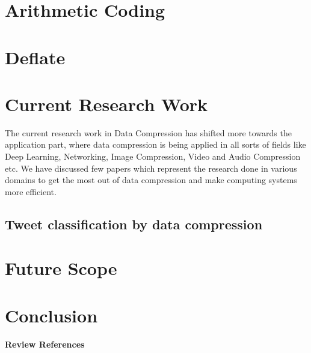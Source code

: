 \documentclass{article}
\begin{document}
\section{Arithmetic Coding}

\section{Deflate}

\section{Current Research Work}

The current research work in Data Compression has shifted more towards the application part, where data compression is being applied in all sorts of fields like Deep Learning, Networking, Image Compression, Video and Audio Compression etc. We have discussed few papers which represent the research done in various domains to get the most out of data compression and make computing systems more efficient.

\subsection{Tweet classification by data compression\cite{10.1145/2064448.2064473}}



\section{Future Scope}

\section{Conclusion}





\textbf{Review References}
\end{document}
